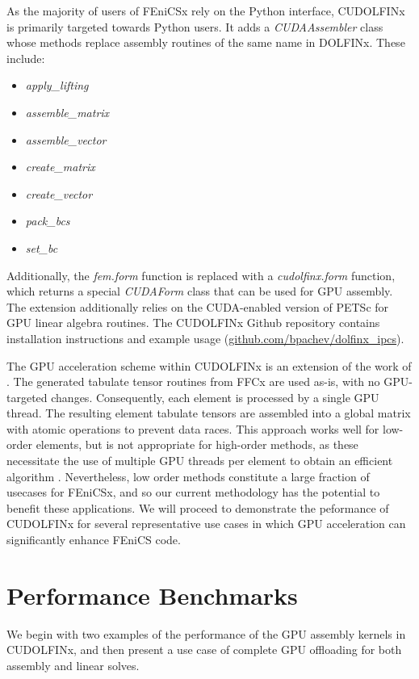 As the majority of users of FEniCSx rely on the Python interface, CUDOLFINx is primarily targeted towards Python users. It adds a \textit{CUDAAssembler} class whose methods replace assembly routines of the same name in DOLFINx. These include:
\begin{itemize}
\item \textit{apply\_lifting}
\item \textit{assemble\_matrix}
\item \textit{assemble\_vector}
\item \textit{create\_matrix}
\item \textit{create\_vector}
\item \textit{pack\_bcs}
\item \textit{set\_bc}
\end{itemize}
Additionally, the \textit{fem.form} function is replaced with a \textit{cudolfinx.form} function, which returns a special \textit{CUDAForm} class that can be used for GPU assembly. The extension additionally relies on the CUDA-enabled version of PETSc for GPU linear algebra routines. The CUDOLFINx Github repository contains installation instructions and example usage (\href{https://github.com/bpachev/dolfinx\_ipcs}{github.com/bpachev/dolfinx\_ipcs}).

The GPU acceleration scheme within CUDOLFINx is an extension of the work of \cite{trotter2023targeting}. The generated tabulate tensor routines from FFCx are used as-is, with no GPU-targeted changes. Consequently, each element is processed by a single GPU thread. The resulting element tabulate tensors are assembled into a global matrix with atomic operations to prevent data races. This approach works well for low-order elements, but is not appropriate for high-order methods, as these necessitate the use of multiple GPU threads per element to obtain an efficient algorithm \cite{MACIOL20101093,dziekonski2013generation,banas2014numerical}. Nevertheless, low order methods constitute a large fraction of usecases for FEniCSx, and so our current methodology has the potential to benefit these applications. We will proceed to demonstrate the peformance of CUDOLFINx for several representative use cases in which GPU acceleration can significantly enhance FEniCS code.

\section*{Performance Benchmarks}

We begin with two examples of the performance of the GPU assembly kernels in CUDOLFINx, and then present a use case of complete GPU offloading for both assembly and linear solves.

